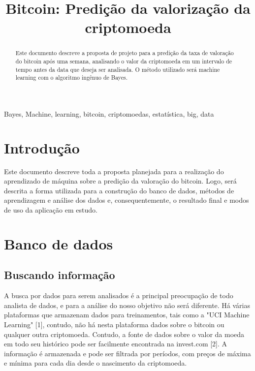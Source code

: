\documentclass[conference]{IEEEtran}
\begin{document}
\title{Bitcoin: Predição da valorização da criptomoeda\\
}

\author{
}

\maketitle

\begin{abstract}
Este documento descreve a proposta de projeto para a predição da taxa de valoração do bitcoin após uma semana, analisando o valor da criptomoeda em um intervalo de tempo antes da data que deseja ser analisada. O método utilizado será machine learning com o algoritmo ingênuo de Bayes.
\end{abstract}

\begin{IEEEkeywords}
Bayes, Machine, learning, bitcoin, criptomoedas, estatística, big, data
\end{IEEEkeywords}

\section{Introdução}
Este documento descreve toda a proposta planejada para a realização do aprendizado de máquina sobre a predição da valoração do bitcoin. Logo, será descrita a forma utilizada para a construção do banco de dados, métodos de aprendizagem e análise dos dados e, consequentemente, o resultado final e modos de uso da aplicação em estudo.

\section{Banco de dados}

\subsection{Buscando informação}

A busca por dados para serem analisados é a principal preocupação de todo analista de dados, e para a análise do nosso objetivo não será diferente. Há várias plataformas que armazenam dados para treinamentos, tais como a "UCI Machine Learning" [1], contudo, não há nesta plataforma dados sobre o bitcoin ou qualquer outra criptomoeda. Contudo, a fonte de dados sobre o valor da moeda em todo seu histórico pode ser facilmente encontrada na invest.com [2]. A informação é armazenada e pode ser filtrada por períodos, com preços de máxima e mínima para cada dia desde o nascimento da criptomoeda.
\end{document}
